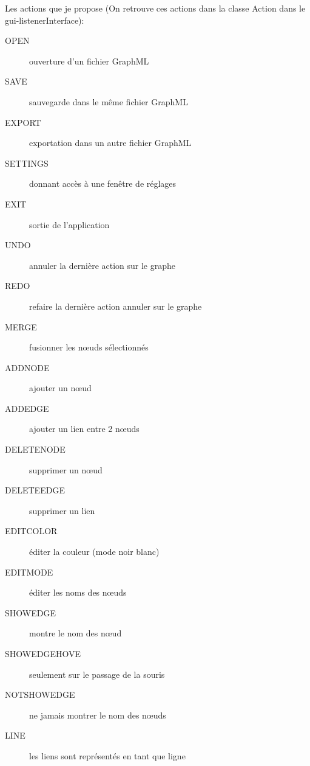 \documentclass[french]{article}
\begin{document}
  		Les actions que je propose 
      (On retrouve ces actions dans la classe Action dans le gui-listenerInterface):
  		\nopagebreak[4]
      \begin{description}
      \item [{OPEN}] ouverture d'un fichier GraphML

      \item [{SAVE}]      sauvegarde dans le même fichier GraphML

        \item [{EXPORT}]    exportation dans un autre fichier GraphML

        \item [{SETTINGS}]  donnant accès à une fenêtre de réglages

        \item [{EXIT}]    sortie de l'application

        \item [{UNDO}]    annuler la dernière action sur le graphe

        \item [{REDO}]    refaire la dernière action annuler sur le graphe

        \item [{MERGE}]     fusionner les nœuds sélectionnés

        \item [{ADDNODE}]     ajouter un nœud

        \item [{ADDEDGE}]     ajouter un lien entre 2 nœuds

        \item [{DELETENODE}]  supprimer un nœud

        \item [{DELETEEDGE}]  supprimer un lien

        \item [{EDITCOLOR}] éditer la couleur (mode noir blanc)

        \item [{EDITMODE}]  éditer les noms des nœuds 

        \item [{SHOWEDGE}]  montre le nom des nœud

        \item [{SHOWEDGEHOVE}] seulement sur le passage de la souris 

        \item [{NOTSHOWEDGE}]   ne jamais montrer le nom des nœuds

        \item [{LINE}]    les liens sont représentés en tant que ligne


\end{description}
\end{document}
